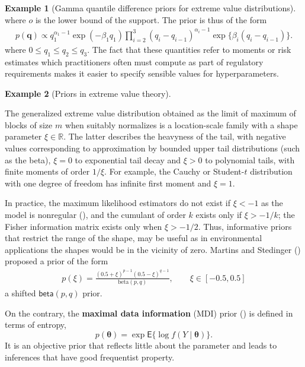 \documentclass[
  11pt,
  letterpaper,
]{scrbook}
\theoremstyle{definition}
\newtheorem{example}{Example}[chapter]
\theoremstyle{plain}
\theoremstyle{plain}
\theoremstyle{plain}
\theoremstyle{definition}
\theoremstyle{definition}
\theoremstyle{plain}
\theoremstyle{plain}
\theoremstyle{remark}
\begin{document}
\begin{example}[Gamma quantile difference priors for extreme value
distributions]
where \(o\) is the lower bound of the support. The prior is thus of the
form \begin{align*}
p(\boldsymbol{q}) \propto q_1^{\alpha_1-1}\exp(-\beta_1 q_1) \prod_{i=2}^3 (q_i-q_{i-1})^{\alpha_i-1} \exp\{\beta_i(q_i-q_{i-1})\}.
\end{align*} where \(0 \leq q_1 \leq q_2 \leq q_3.\) The fact that these
quantities refer to moments or risk estimates which practitioners often
must compute as part of regulatory requirements makes it easier to
specify sensible values for hyperparameters.

\end{example}

\begin{example}[Priors in extreme value
theory]\protect\hypertarget{exm-martins}{}\label{exm-martins}

The generalized extreme value distribution obtained as the limit of
maximum of blocks of size \(m\) when suitably normalizes is a
location-scale family with a shape parameter \(\xi \in \mathbb{R}\). The
latter describes the heavyness of the tail, with negative values
corresponding to approximation by bounded upper tail distributions (such
as the beta), \(\xi=0\) to exponential tail decay and \(\xi>0\) to
polynomial tails, with finite moments of order \(1/\xi\). For example,
the Cauchy or Student-\(t\) distribution with one degree of freedom has
infinite first moment and \(\xi=1\).

In practice, the maximum likelihood estimators do not exist if
\(\xi < -1\) as the model is nonregular (), and the cumulant of order \(k\) exists only if \(\xi > -1/k\);
the Fisher information matrix exists only when \(\xi > -1/2\). Thus,
informative priors that restrict the range of the shape, may be useful
as in environmental applications the shapes would be in the vicinity of
zero. Martins and Stedinger
() proposed a prior of the
form \begin{align*}
p(\xi) =\frac{(0.5+\xi)^{p-1}(0.5-\xi)^{q-1}}{\mathrm{beta}(p,q)}, \qquad \xi \in [-0.5, 0.5]
\end{align*} a shifted \(\mathsf{beta}(p,q)\) prior.

On the contrary, the \textbf{maximal data information} (MDI) prior
() is defined in terms of
entropy,
\[p(\boldsymbol{\theta}) = \exp \mathsf{E}\{\log f(Y \mid \boldsymbol{\theta})\}.\]
It is an objective prior that reflects little about the parameter and
leads to inferences that have good frequentist property.


\end{example}
\end{document}

